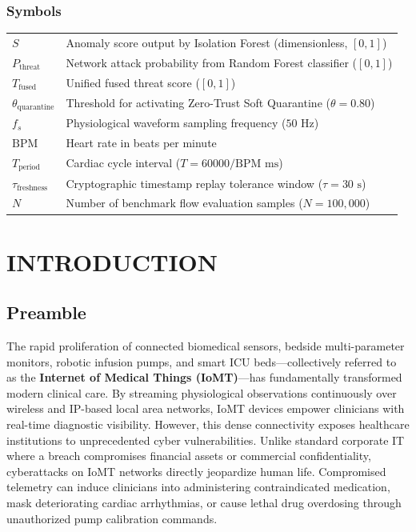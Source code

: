 \documentclass[12pt,a4paper]{report}
\begin{document}
\subsection*{Symbols}
\begin{tabular}{ll}
    $S$ & Anomaly score output by Isolation Forest (dimensionless, $[0, 1]$) \\
    $P_{\text{threat}}$ & Network attack probability from Random Forest classifier ($[0, 1]$) \\
    $T_{\text{fused}}$ & Unified fused threat score ($[0, 1]$) \\
    $\theta_{\text{quarantine}}$ & Threshold for activating Zero-Trust Soft Quarantine ($\theta = 0.80$) \\
    $f_s$ & Physiological waveform sampling frequency ($50\text{ Hz}$) \\
    $\text{BPM}$ & Heart rate in beats per minute \\
    $T_{\text{period}}$ & Cardiac cycle interval ($T = 60000 / \text{BPM}\text{ ms}$) \\
    $\tau_{\text{freshness}}$ & Cryptographic timestamp replay tolerance window ($\tau = 30\text{ s}$) \\
    $N$ & Number of benchmark flow evaluation samples ($N = 100,000$) \\
\end{tabular}

\newpage
{}
\setcounter{page}{1}

\chapter{INTRODUCTION}

\section{Preamble}
The rapid proliferation of connected biomedical sensors, bedside multi-parameter monitors, robotic infusion pumps, and smart ICU beds---collectively referred to as the \textbf{Internet of Medical Things (IoMT)}---has fundamentally transformed modern clinical care. By streaming physiological observations continuously over wireless and IP-based local area networks, IoMT devices empower clinicians with real-time diagnostic visibility. However, this dense connectivity exposes healthcare institutions to unprecedented cyber vulnerabilities. Unlike standard corporate IT where a breach compromises financial assets or commercial confidentiality, cyberattacks on IoMT networks directly jeopardize human life. Compromised telemetry can induce clinicians into administering contraindicated medication, mask deteriorating cardiac arrhythmias, or cause lethal drug overdosing through unauthorized pump calibration commands.
\end{document}
